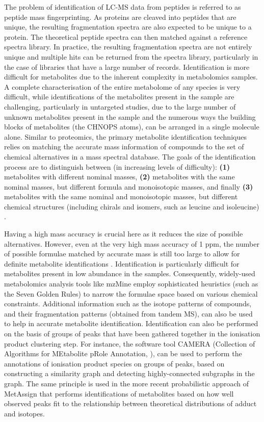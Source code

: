 The problem of identification of LC-MS data from peptides is referred to as peptide mass fingerprinting. As proteins are cleaved into peptides that are unique, the resulting fragmentation spectra are also expected to be unique to a protein. The theoretical peptide spectra can then matched against a reference spectra library. In practice, the resulting fragmentation spectra are not entirely unique and multiple hits can be returned from the spectra library, particularly in the case of libraries that have a large number of records. Identification is more difficult for metabolites due to the inherent complexity in metabolomics samples. A complete characterisation of the entire metabolome of any species is very difficult, while identifications of the metabolites present in the sample are challenging, particularly in untargeted studies, due to the large number of unknown metabolites present in the sample and the numerous ways the building blocks of metabolites (the CHNOPS atoms), can be arranged in a single molecule alone. Similar to proteomics, the primary metabolite identification techniques relies on matching the accurate mass information of compounds to the set of chemical alternatives in a mass spectral database. The goals of the identification process are to distinguish between (in increasing levels of difficulty): \textbf{(1)} metabolites with different nominal masses, \textbf{(2)} metabolites with the same nominal masses, but different formula and monoisotopic masses, and finally \textbf{(3)} metabolites with the same nominal and monoisotopic masses, but different chemical structures (including chirals and isomers, such as leucine and isoleucine) \cite{Dunn2012}.

Having a high mass accuracy is crucial here as it reduces the size of possible alternatives. However, even at the very high mass accuracy of 1 ppm, the number of possible formulae matched by accurate mass is still too large to allow for definite metabolite identifications \cite{Kind2006}. Identification is particularly difficult for metabolites present in low abundance in the samples. Consequently, widely-used metabolomics analysis tools like mzMine \cite{Pluskal2010} employ sophisticated heuristics (such as the Seven Golden Rules) to narrow the formulae space based on various chemical constraints. Additional information such as the isotope patterns of compounds, and their fragmentation patterns (obtained from tandem MS), can also be used to help in accurate metabolite identification. Identification can also be performed on the basis of groups of peaks that have been gathered together in the ionisation product clustering step. For instance, the software tool CAMERA (Collection of Algorithms for MEtabolite pRole Annotation, \cite{Kuhl2012}), can be used to perform the annotations of ionisation product species on groups of peaks, based on constructing a similarity graph and detecting highly-connected subgraphs in the graph. The same principle is used in the more recent probabilistic approach of MetAssign \cite{Daly2014} that performs identifications of metabolites based on how well observed peaks fit to the relationship between theoretical distributions of adduct and isotopes. 

